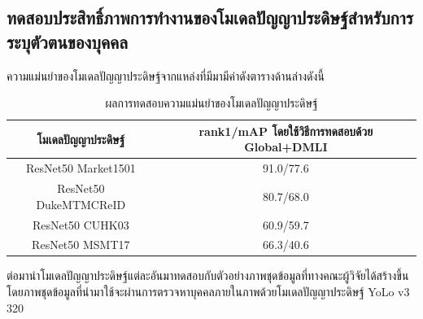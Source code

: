 \subsection{ทดสอบประสิทธิ์ภาพการทำงานของโมเดลปัญญาประดิษฐ์สำหรับการระบุตัวตนของบุคคล}
ความแม่นยำของโมเดลปัญญาประดิษฐ์จากแหล่งที่มีมามีค่าดังตารางด้านล่างดังนี้
\begin{table}[!ht]
    \centering
    \begin{tabular}{|c|c|}
            \hline
            {โมเดลปัญญาประดิษฐ์}&{rank1/mAP โดยใช้วิธีการทดสอบด้วย Global+DMLI}				\\
            \hline
            ResNet50 Market1501	 			& 91.0/77.6								\\
            ResNet50 DukeMTMCReID			& 80.7/68.0								\\
            ResNet50 CUHK03				& 60.9/59.7								\\
            ResNet50 MSMT17				& 66.3/40.6								\\
        \hline
    \end{tabular}
    \caption{ผลการทดสอบความแม่นยำของโมเดลปัญญาประดิษฐ์}
    \label{tab: Accuracy of model ReID}
\end{table}
ต่อมานำโมเดลปัญญาประดิษฐ์แต่ละอันมาทดสอบกับตัวอย่างภาพชุดข้อมูลที่ทางคณะผู้วิจัยได้สร้างขึ้น โดยภาพชุดข้อมูลที่นำมาใช้จะผ่านการตรวจหาบุคคลภายในภาพด้วยโมเดลปัญญาประดิษฐ์ YoLo v3 320
